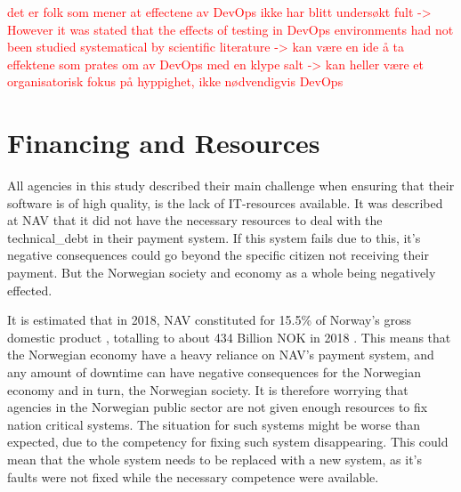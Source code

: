 


\textcolor{red}{det er folk som mener at effectene av DevOps ikke har blitt undersøkt fult -> However it was stated that the effects of testing in DevOps environments had not been studied systematical by scientific literature \cite{dsc_2019}\cite{ja_2016} -> kan være en ide å ta effektene som prates om av DevOps med en klype salt -> kan heller være et organisatorisk fokus på hyppighet, ikke nødvendigvis DevOps}

\section{Financing and Resources}
All agencies in this study described their main challenge when ensuring that their software is of high quality, is the lack of IT-resources available. It was described at NAV that it did not have the necessary resources to deal with the \gls{technical_debt} in their payment system. If this system fails due to this, it's negative consequences could go beyond the specific citizen not receiving their payment. But the Norwegian society and economy as a whole being negatively effected. 

It is estimated that in 2018, NAV constituted for 15.5\% of Norway's gross domestic product \cite{nav_ytelsene_frem_mot_2060_2019}, totalling to about 434 Billion NOK in 2018 \cite{faktaark_finansdepartementet_2020}. This means that the Norwegian economy have a heavy reliance on NAV's payment system, and any amount of downtime can have negative consequences for the Norwegian economy and in turn, the Norwegian society. It is therefore worrying that agencies in the Norwegian public sector are not given enough resources to fix nation critical systems. The situation for such systems might be worse than expected, due to the competency for fixing such system disappearing. This could mean that the whole system needs to be replaced with a new system, as it's faults were not fixed while the necessary competence were available.

